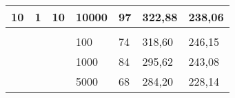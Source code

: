 \documentclass{article}
\begin{document}
\begin{table}[h]
\begin{tabular}{lllllll}
			\multicolumn{1}{|l|}{\multirow{-4}{*}{10}}                             & \multicolumn{1}{l|}{\multirow{-4}{*}{1}}       & \multicolumn{1}{l|}{\multirow{-4}{*}{10}}                             & \multicolumn{1}{l|}{10000}                                                & \multicolumn{1}{l|}{97}                                                      & \multicolumn{1}{l|}{322,88}                                                         & \multicolumn{1}{l|}{238,06}                                                           \\ \hline
			&                                                &                                                                       &                                                                           &                                                                              &                                                                                     &                                                                                       \\ \hline
			\multicolumn{1}{|l|}{}                                                 & \multicolumn{1}{l|}{}                          & \multicolumn{1}{l|}{}                                                 & \multicolumn{1}{l|}{100}                                                  & \multicolumn{1}{l|}{74}                                                      & \multicolumn{1}{l|}{318,60}                                                         & \multicolumn{1}{l|}{246,15}                                                           \\ \cline{4-7} 
			\multicolumn{1}{|l|}{}                                                 & \multicolumn{1}{l|}{}                          & \multicolumn{1}{l|}{}                                                 & \multicolumn{1}{l|}{1000}                                                 & \multicolumn{1}{l|}{84}                                                      & \multicolumn{1}{l|}{295,62}                                                         & \multicolumn{1}{l|}{243,08}                                                           \\ \cline{4-7} 
			\multicolumn{1}{|l|}{}                                                 & \multicolumn{1}{l|}{}                          & \multicolumn{1}{l|}{}                                                 & \multicolumn{1}{l|}{5000}                                                 & \multicolumn{1}{l|}{68}                                                      & \multicolumn{1}{l|}{284,20}                                                         & \multicolumn{1}{l|}{228,14}                                                           \\ \cline{4-7} 

\end{tabular}
\end{table}
\end{document}
